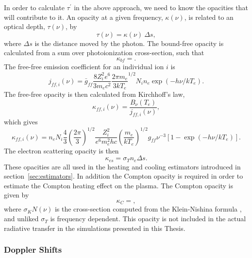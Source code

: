 In order to calculate $\tau^\prime$ in the above approach, we need
to know the opacities that will contribute to it. An opacity 
at a given frequency, $\kappa(\nu)$,
is related to an optical depth, $\tau(\nu)$, by
\begin{equation}
\tau(\nu) = \kappa(\nu)~\Delta s,
\end{equation}
where $\Delta s$ is the distance moved by the photon. The bound-free
opacity is calculated from a sum over photoionization cross-section,
such that
\begin{equation}
\kappa_{bf} = .
\end{equation}
The free-free emission coefficient for an individual ion $i$ is \citep{gayet1970}
\begin{equation}
j_{ff,i} (\nu) = \bar{g}_{ff}\frac{8Z_i^2e^6}{3m_e c^2}
\frac{2\pi m_e}{3 k T_e}^{1/2}
N_i n_e \exp(-h\nu/kT_e).
\label{eq:jff} 
\end{equation}
The free-free opacity is then calculated from Kirchhoff's law, 
\begin{equation}
\kappa_{ff, i}(\nu) = \frac{B_\nu (T_e)}{j_{ff,i} (\nu)},
\end{equation}
which gives
\begin{equation}
\kappa_{ff, i}(\nu) = n_e N_i \frac{4}{3} \left(\frac{2\pi}{3}\right)^{1/2} 
\frac{Z_i^2}{e^6 m_e^2 hc} \left(\frac{m_e}{kT_e}\right)^{1/2} 
g_{ff} \nu^{-3} [1 - \exp(-h\nu/kT_e)].
\end{equation}
The electron scattering opacity is then 
\begin{equation}
\kappa_{es} = \sigma_T n_e \Delta s.
\end{equation}
These opacities are all used in the heating and cooling estimators 
introduced in section~\ref{sec:estimators}. In addition the
Compton opacity is required in order to estimate the Compton heating effect on the plasma.
The Compton opacity is given by
\begin{equation}
\kappa_{C} = ,
\end{equation}
where $\sigma_KN (\nu)$ is the cross-section computed 
from the Klein-Nishina formula \citep{klein-nishina}, and unliked $\sigma_T$
is frequency dependent. This opacity is not included in the actual radiative transfer 
in the simulations presented in this Thesis.

\subsubsection{Doppler Shifts}

